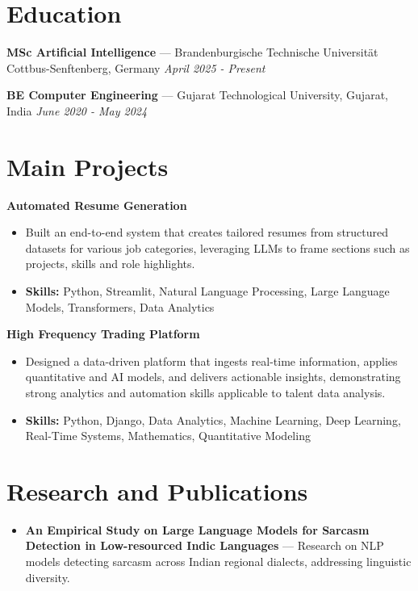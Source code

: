 \documentclass[a4paper,10pt]{article}
\begin{document}
\section*{Education}
\textbf{MSc Artificial Intelligence} — Brandenburgische Technische Universität Cottbus-Senftenberg, Germany \hfill \textit{April 2025 - Present}\par
\vspace{1.5pt}
\textbf{BE Computer Engineering} — Gujarat Technological University, Gujarat, India \hfill \textit{June 2020 - May 2024}\par

\section*{Main Projects}
\textbf{Automated Resume Generation}\par
\vspace{1pt}
\begin{itemize}
  \item Built an end-to-end system that creates tailored resumes from structured datasets for various job categories, leveraging LLMs to frame sections such as projects, skills and role highlights.
  \item \textbf{Skills:} Python, Streamlit, Natural Language Processing, Large Language Models, Transformers, Data Analytics
\end{itemize}
\vspace{3pt}
\textbf{High Frequency Trading Platform}\par
\vspace{1pt}
\begin{itemize}
  \item Designed a data-driven platform that ingests real-time information, applies quantitative and AI models, and delivers actionable insights, demonstrating strong analytics and automation skills applicable to talent data analysis.
  \item \textbf{Skills:} Python, Django, Data Analytics, Machine Learning, Deep Learning, Real-Time Systems, Mathematics, Quantitative Modeling
\end{itemize}

\section*{Research and Publications}
\begin{itemize}
\item \textbf{An Empirical Study on Large Language Models for Sarcasm Detection in Low-resourced Indic Languages} — Research on NLP models detecting sarcasm across Indian regional dialects, addressing linguistic diversity.
\end{itemize}
\end{document}
